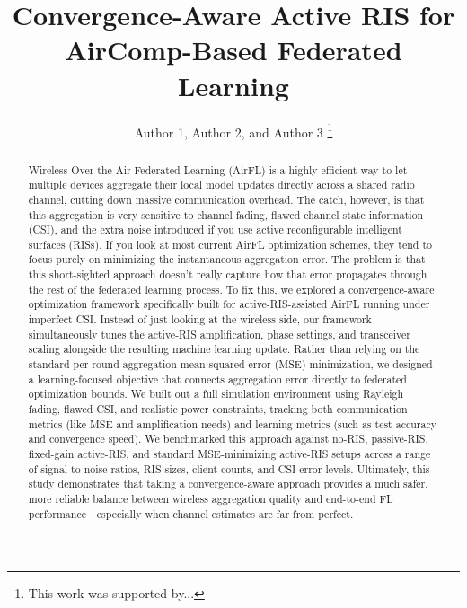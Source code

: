 \documentclass[lettersize,journal]{IEEEtran}
\begin{document}
\title{Convergence-Aware Active RIS for AirComp-Based Federated Learning}

\author{Author 1, Author 2, and Author 3 %
\thanks{This work was supported by...}%
}

\maketitle

\begin{abstract}
Wireless Over-the-Air Federated Learning (AirFL) is a highly efficient way to let multiple devices aggregate their local model updates directly across a shared radio channel, cutting down massive communication overhead. The catch, however, is that this aggregation is very sensitive to channel fading, flawed channel state information (CSI), and the extra noise introduced if you use active reconfigurable intelligent surfaces (RISs). If you look at most current AirFL optimization schemes, they tend to focus purely on minimizing the instantaneous aggregation error. The problem is that this short-sighted approach doesn't really capture how that error propagates through the rest of the federated learning process. To fix this, we explored a convergence-aware optimization framework specifically built for active-RIS-assisted AirFL running under imperfect CSI. Instead of just looking at the wireless side, our framework simultaneously tunes the active-RIS amplification, phase settings, and transceiver scaling alongside the resulting machine learning update. Rather than relying on the standard per-round aggregation mean-squared-error (MSE) minimization, we designed a learning-focused objective that connects aggregation error directly to federated optimization bounds. We built out a full simulation environment using Rayleigh fading, flawed CSI, and realistic power constraints, tracking both communication metrics (like MSE and amplification needs) and learning metrics (such as test accuracy and convergence speed). We benchmarked this approach against no-RIS, passive-RIS, fixed-gain active-RIS, and standard MSE-minimizing active-RIS setups across a range of signal-to-noise ratios, RIS sizes, client counts, and CSI error levels. Ultimately, this study demonstrates that taking a convergence-aware approach provides a much safer, more reliable balance between wireless aggregation quality and end-to-end FL performance---especially when channel estimates are far from perfect.
\end{abstract}
\end{document}
